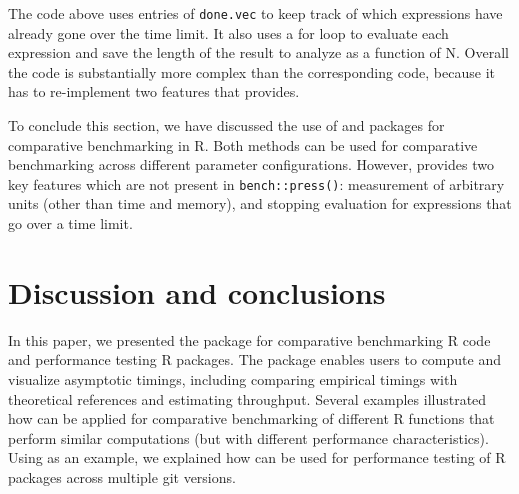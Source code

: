 \begin{Schunk}
\end{Schunk}
The code above uses entries of \verb|done.vec| to keep track of which expressions have already gone over the time limit.
It also uses a for loop to evaluate each expression and save the length of the result to analyze as a function of N.
Overall the code is substantially more complex than the corresponding  code, because it has to re-implement two features that  provides.

To conclude this section, we have discussed the use of  and  packages for comparative benchmarking in R. 
Both methods can be used for comparative benchmarking across different parameter configurations. 
However,  provides two key features which are not present in \verb|bench::press()|: measurement of arbitrary units (other than time and memory), and stopping evaluation for expressions that go over a time limit.

\section{Discussion and conclusions}

In this paper, we presented the  package for comparative benchmarking R code and performance testing R packages. 
The  package enables users to compute and visualize asymptotic timings, including comparing empirical timings with theoretical references and estimating throughput.
Several examples illustrated how  can be applied for comparative benchmarking of different R functions that perform similar computations (but with different performance characteristics).
Using  as an example, we explained how  can be used for performance testing of R packages across multiple git versions. 

